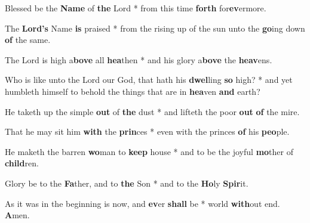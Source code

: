 \begin{multicols}{2}
	Blessed be the \textbf{Name} of \textbf{the} Lord * from this time \textbf{forth} for\textbf{ev}ermore.
	
	The \textbf{Lord's} Name \textbf{is} praised * from the rising up of the sun unto the \textbf{go}ing down \textbf{of} the same.
	
	The Lord is high a\textbf{bove} all \textbf{ hea}then * and his glory a\textbf{bove} the \textbf{heav}ens.
	
	Who is like unto the Lord our God, that hath his \textbf{dwel}ling \textbf{so} high? * and yet humbleth himself to behold the things that are in \textbf{hea}ven \textbf{and} earth?
	
	He taketh up the simple \textbf{out} of \textbf{the} dust * and lifteth the poor \textbf{out} \textbf{of} the mire.
	
	That he may sit him \textbf{with} the \textbf{prin}ces * even with the princes \textbf{of} his \textbf{peo}ple.
	
	He maketh the barren \textbf{wo}man to \textbf{keep} house * and to be the joyful \textbf{mo}ther of \textbf{child}ren.
	
	Glory be to the \textbf{Fa}ther, and to \textbf{the} Son * and to the \textbf{Ho}ly \textbf{Spir}it.
	
	As it was in the beginning is now, and \textbf{ev}er \textbf{shall} be * world \textbf{with}out end. \textbf{A}men.
\end{multicols}